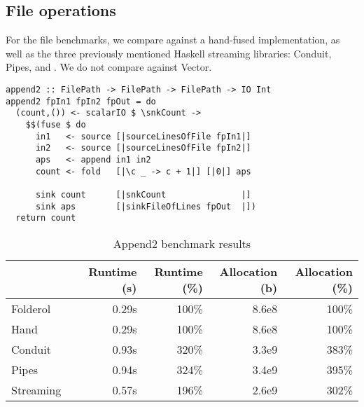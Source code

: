 \subsection{File operations}
For the file benchmarks, we compare against a hand-fused implementation, as well as the three previously mentioned Haskell streaming libraries: Conduit, Pipes, and \Streaming.
We do not compare against Vector.

\begin{lstlisting}[float,label=l:bench:append2Folderol,caption=Folderol implementation of \Hs/append2/]
append2 :: FilePath -> FilePath -> FilePath -> IO Int
append2 fpIn1 fpIn2 fpOut = do
  (count,()) <- scalarIO $ \snkCount ->
    $$(fuse $ do
      in1   <- source [|sourceLinesOfFile fpIn1|]
      in2   <- source [|sourceLinesOfFile fpIn2|]
      aps   <- append in1 in2
      count <- fold   [|\c _ -> c + 1|] [|0|] aps

      sink count      [|snkCount               |]
      sink aps        [|sinkFileOfLines fpOut  |])
  return count
\end{lstlisting}

\begin{table}
\begin{center}
\begin{tabular}{ll|rrrr}
& & Runtime (s)  & Runtime (\%) & Allocation (b) & Allocation (\%) \\
\hline
Folderol &          & 0.29s &   100\% & 8.6e8 & 100\% \\
Hand     &          & 0.29s &   100\% & 8.6e8 & 100\% \\
Conduit &           & 0.93s &   320\% & 3.3e9 & 383\% \\
Pipes  &            & 0.94s &   324\% & 3.4e9 & 395\% \\
Streaming &         & 0.57s &   196\% & 2.6e9 & 302\% \\
\end{tabular}
\end{center}
\caption[Append2 benchmark results]{Append2 benchmark results}
\label{table:bench:append2}
\end{table}


